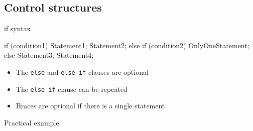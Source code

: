 \subsection[Control]{Control structures}

\begin{frame}[fragile]
  \begin{block}{if syntax}
    \begin{cppcode*}{}
      if (condition1) {
        Statement1; Statement2;
      } else if (condition2)
        OnlyOneStatement;
      else {
        Statement3;
        Statement4;
      }
    \end{cppcode*}
    \begin{itemize}
      \item The \texttt{else} and \texttt{else if} clauses are optional
      \item The \texttt{else if} clause can be repeated
      \item Braces are optional if there is a single statement
    \end{itemize}
  \end{block}
\end{frame}

\begin{frame}[fragile]
  \begin{exampleblock}{Practical example}
  \end{exampleblock}
\end{frame}

